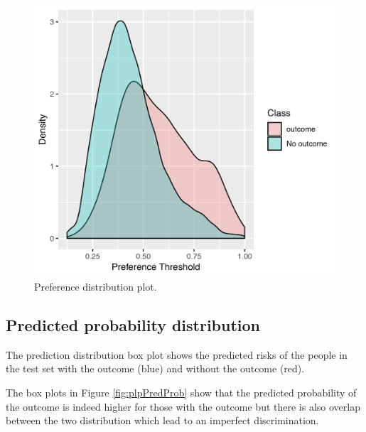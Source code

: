 \documentclass[11pt]{book}
\begin{document}
\begin{figure}

{\centering \includegraphics[width=0.9\linewidth]{images/PatientLevelPrediction/preferencePDF} 

}

\caption{Preference distribution plot.}\label{fig:plpPreference}
\end{figure}

\subsection{Predicted probability
distribution}\label{predicted-probability-distribution}

The prediction distribution box plot shows the predicted risks of the
people in the test set with the outcome (blue) and without the outcome
(red).

The box plots in Figure \ref{fig:plpPredProb} show that the predicted
probability of the outcome is indeed higher for those with the outcome
but there is also overlap between the two distribution which lead to an
imperfect discrimination.
\end{document}
